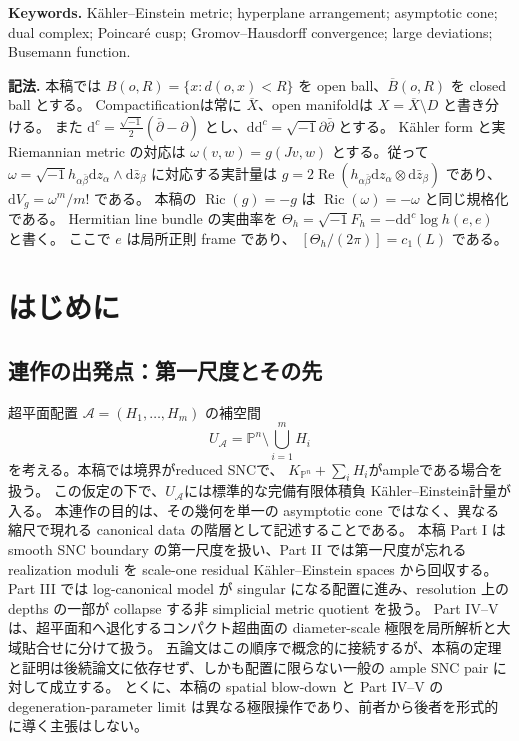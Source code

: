 \documentclass[11pt,a4paper]{ltjsarticle}
\newcommand{\PP}{\mathbb P}
\newcommand{\dd}{\mathrm d}
\newcommand{\ov}{\overline}
\theoremstyle{plain}
\theoremstyle{definition}
\theoremstyle{remark}
\begin{document}
\medskip
\noindent\textbf{Keywords.}
K\"ahler--Einstein metric; hyperplane arrangement; asymptotic cone; dual complex; Poincar\'e cusp; Gromov--Hausdorff convergence; large deviations; Busemann function.

\medskip
\noindent\textbf{記法.}
本稿では $B(o,R)=\{x:d(o,x)<R\}$ を open ball、$\ov B(o,R)$ を closed ball とする。
Compactificationは常に $\ov X$、open manifoldは $X=\ov X\setminus D$ と書き分ける。
また $\dd^c=\frac{\sqrt{-1}}2(\bar\partial-\partial)$ とし、$\dd\dd^c=\sqrt{-1}\partial\bar\partial$ とする。
K\"ahler form と実 Riemannian metric の対応は
$\omega(v,w)=g(Jv,w)$ とする。従って
$\omega=\sqrt{-1}h_{\alpha\bar\beta}\dd z_\alpha\wedge
\dd\bar z_\beta$ に対応する実計量は
$g=2\operatorname{Re}(h_{\alpha\bar\beta}\dd z_\alpha\otimes
\dd\bar z_\beta)$ であり、$\dd V_g=\omega^m/m!$ である。
本稿の $\operatorname{Ric}(g)=-g$ は
$\operatorname{Ric}(\omega)=-\omega$ と同じ規格化である。
Hermitian line bundle の実曲率を
$\Theta_h=\sqrt{-1}F_h=-\dd\dd^c\log h(e,e)$ と書く。
ここで $e$ は局所正則 frame であり、
$[\Theta_h/(2\pi)]=c_1(L)$ である。

{\small\tableofcontents}
\clearpage

\section{はじめに}
\label{sec:introduction}

\subsection{連作の出発点：第一尺度とその先}
超平面配置 $\mathcal A=(H_1,\ldots,H_m)$ の補空間
\[
 U_{\mathcal A}=\PP^n\setminus\bigcup_{i=1}^m H_i
\]
を考える。本稿では境界がreduced SNCで、
$K_{\PP^n}+\sum_iH_i$がampleである場合を扱う。
この仮定の下で、$U_{\mathcal A}$には標準的な完備有限体積負
K\"ahler--Einstein計量が入る\cite[Theorem~1]{Kobayashi}。
本連作の目的は、その幾何を単一の asymptotic cone ではなく、異なる縮尺で現れる canonical data の階層として記述することである。
本稿 Part I は smooth SNC boundary の第一尺度を扱い、Part II では第一尺度が忘れる realization moduli を scale-one residual K\"ahler--Einstein spaces から回収する。
Part III では log-canonical model が singular になる配置に進み、resolution 上の depths の一部が collapse する非 simplicial metric quotient を扱う。
Part IV--V は、超平面和へ退化するコンパクト超曲面の diameter-scale 極限を局所解析と大域貼合せに分けて扱う。
五論文はこの順序で概念的に接続するが、本稿の定理と証明は後続論文に依存せず、しかも配置に限らない一般の ample SNC pair に対して成立する。
とくに、本稿の spatial blow-down と Part IV--V の degeneration-parameter limit は異なる極限操作であり、前者から後者を形式的に導く主張はしない。
\end{document}
